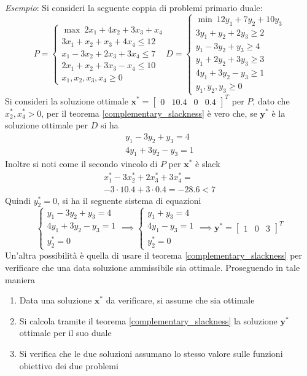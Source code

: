 \documentclass[10pt, letterpaper]{report}
\newcommand{\x}{{\mathbf{x}}}
\newcommand{\y}{{\mathbf{y}}}
\begin{document}
\textit{Esempio}: Si consideri la seguente coppia di problemi primario duale: 
\begin{equation}
    P=\begin{cases}
        \max \  2x_1+4x_2+3x_3+x_4\\
        3x_1+x_2+x_3+4x_4\le 12\\ 
        x_1-3x_2+2x_3+3x_4\le 7\\ 
        2x_1+x_2+3x_3-x_4\le 10\\ 
        x_1,x_2,x_3,x_4\ge 0
    \end{cases}
    D=\begin{cases}
        \min \ 12y_1+7y_2+10y_3\\ 
        3y_1+y_2+2y_3\ge2\\
        y_1-3y_2+y_3\ge 4\\ 
        y_1+2y_2+3y_3\ge 3 \\ 
        4y_1+3y_2-y_3\ge 1\\ 
        y_1,y_2,y_3 \ge 0 
    \end{cases}
\end{equation}
Si consideri la soluzione ottimale $\x^*=\begin{bmatrix}
    0&10.4&0&0.4
\end{bmatrix}^T$ per $P$, dato che $x_2^*,x_4^*>0$, per il teorema \ref{complementary_slackness} è vero che, se $\y^*$ è la soluzione ottimale per $D$ si ha 
\begin{eqnarray*}
y_1-3y_2+y_3 = 4\\ 
4y_1+3y_2-y_3 = 1
\end{eqnarray*}
Inoltre si noti come il secondo vincolo di $P$ per $\x^*$ è slack
\begin{eqnarray*}
     x_1^*-3x_2^*+2x_3^*+3x_4^*=\\
    -3\cdot 10.4+3\cdot 0.4 = -28.6 < 7
\end{eqnarray*}
Quindi $y_2^*=0$, si ha il seguente sistema di equazioni 
$$ 
\begin{cases}
y_1-3y_2+y_3 = 4\\ 
4y_1+3y_2-y_3 = 1\\ 
y_2^*=0
\end{cases}\implies 
\begin{cases}
y_1+y_3 = 4\\ 
4y_1-y_3 = 1\\ 
y_2^*=0
\end{cases}\implies \y^*=\begin{bmatrix}
    1&0&3
\end{bmatrix}^T
$$
Un'altra possibilità è quella di usare il teorema \ref{complementary_slackness} per verificare che una data soluzione ammissibile sia ottimale. Proseguendo in tale maniera\begin{enumerate}
    \item Data una soluzione $\x^*$ da verificare, si assume che sia ottimale 
    \item Si calcola tramite il teorema \ref{complementary_slackness} la soluzione $\y^*$ ottimale per il suo duale 
    \item Si verifica che le due soluzioni assumano lo stesso valore sulle funzioni obiettivo dei due problemi
\end{enumerate}
\end{document}
